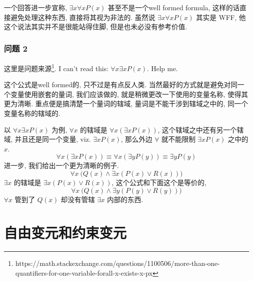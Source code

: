 \documentclass[a4paper, 12pt]{ctexbook} %
\theoremstyle{plain}
\theoremstyle{definition}
\theoremstyle{remark}
\begin{document}
一个回答进一步宣称, $\exists x \forall  x P\left(x\right)$ 甚至不是一个well formed formula, 这样的话直接避免处理这种东西, 直接将其视为非法的. 虽然说 $\exists x \forall  x P \left(x\right) $ 其实是 WFF, 他这个说法其实并不是很能站得住脚, 但是也未必没有参考价值. 

\subsubsection{问题 2}
这里是问题来源\footnote{https://math.stackexchange.com/questions/1100506/more-than-one-quantifiers-for-one-variable-forall-x-exists-x-px}. 
I can't read this: $\forall  x \exists x P \left(x\right) $. Help me. 

这个公式是well formed的, 只不过是有点反人类. 当然最好的方式就是避免对同一个变量使用嵌套的量词,
我们应该做的, 就是稍微更改一下使用的变量名称, 使得其更为清晰. 
重点便是搞清楚一个量词的辖域, 量词是不能干涉到辖域之中的, 同一个变量名称的辖域的. 

以 $\forall  x \exists x P \left(x\right) $ 为例, 
$\forall  x  $ 的辖域是 $\forall  x \left(\exists x P \left(x\right)\right)$, 
这个辖域之中还有另一个辖域, 并且还是同一个变量, viz. $\exists x P\left(x\right)$, 那么外边 $\forall $ 就不能限制 $\exists x P \left(x\right)$ 之中的 $x$. 
\[
\forall  x \left(\exists x P \left(x\right) \right) \equiv  \forall  x \left(\exists y P \left(y\right)\right) \equiv  \exists y P \left( y\right)
\]
进一步, 我们给出一个更为清晰的例子. 
\[
\forall  x \ \Big( Q \left(x \right)  \wedge \exists x \left( P \left(x \right) \vee R \left(x\right)\right)\Big) 
\]
$\exists x  $ 的辖域是 $ \exists x  \left(P \left(x\right) \vee R \left(x\right)\right)$, 这个公式和下面这个是等价的, 
\[
\forall  x \ \Big(Q \left(x\right) \wedge \exists y \left( P \left(y\right) \vee R \left(  y \right)\right)\Big)
\]
$\forall  x  $ 管到了 $Q \left(x\right) $ 却没有管辖 $\exists x$ 内部的东西. 

\section{自由变元和约束变元}
\end{document}
